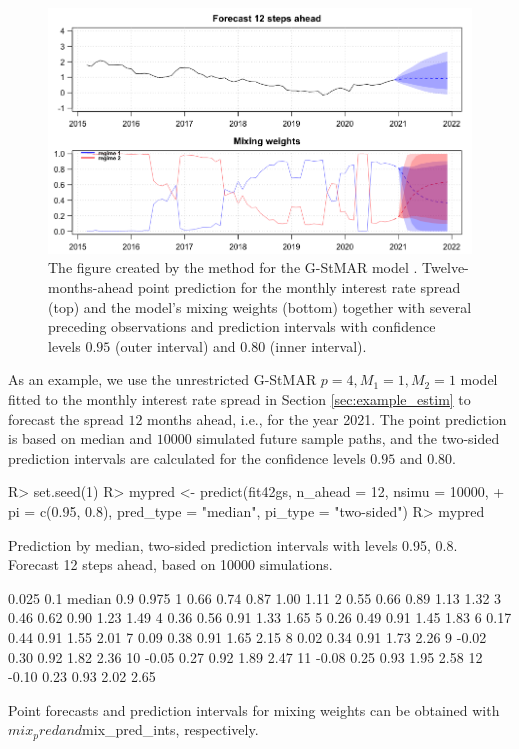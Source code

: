 \documentclass[nojss]{jss} %
\begin{document}
\begin{figure}
  \centering
  \includegraphics{figures/predictfit42gs.png}
  \caption{The figure created by the  method for the G-StMAR model . Twelve-months-ahead point prediction for the monthly interest rate spread (top) and the model's mixing weights (bottom) together with several preceding observations and prediction intervals with confidence levels $0.95$ (outer interval) and $0.80$ (inner interval).}
\label{fig:predictfit42gs}
\end{figure}

As an example, we use the unrestricted G-StMAR $p=4, M_1=1, M_2=1$ model fitted to the monthly interest rate spread in Section \ref{sec:example_estim} to forecast the spread $12$ months ahead, i.e., for the year 2021. The point prediction is based on median and $10000$ simulated future sample paths, and the two-sided prediction intervals are calculated for the confidence levels $0.95$ and $0.80$.
%
\begin{CodeChunk}
\begin{CodeInput}
R> set.seed(1)
R> mypred <- predict(fit42gs, n_ahead = 12, nsimu = 10000,
+    pi = c(0.95, 0.8), pred_type = "median", pi_type = "two-sided")
R> mypred
\end{CodeInput}
\begin{CodeOutput}
Prediction by median, two-sided prediction intervals with levels 0.95, 0.8.
Forecast 12 steps ahead, based on 10000 simulations.

   0.025  0.1 median  0.9 0.975
1   0.66 0.74   0.87 1.00  1.11
2   0.55 0.66   0.89 1.13  1.32
3   0.46 0.62   0.90 1.23  1.49
4   0.36 0.56   0.91 1.33  1.65
5   0.26 0.49   0.91 1.45  1.83
6   0.17 0.44   0.91 1.55  2.01
7   0.09 0.38   0.91 1.65  2.15
8   0.02 0.34   0.91 1.73  2.26
9  -0.02 0.30   0.92 1.82  2.36
10 -0.05 0.27   0.92 1.89  2.47
11 -0.08 0.25   0.93 1.95  2.58
12 -0.10 0.23   0.93 2.02  2.65

Point forecasts and prediction intervals for mixing weights can be obtained
with $mix_pred and $mix_pred_ints, respectively.
\end{CodeOutput}
\end{CodeChunk}
\end{document}
